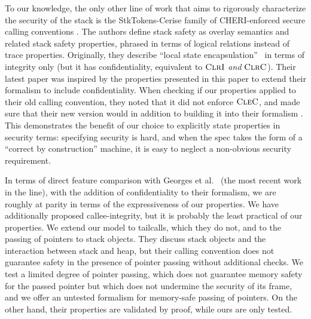 \documentclass[10pt,conference]{ieeetran}%
\theoremstyle{definition}
\begin{document}
To our knowledge, the only other line of work that aims to rigorously characterize the
security of the stack is the StkTokens-Cerise family of CHERI-enforced secure calling
conventions \cite{SkorstengaardLocal, SkorstengaardSTKJFP, Georges22:TempsDesCerises}.
%
The authors define stack safety as overlay semantics and related stack
safety properties, phrased in terms of logical relations instead of trace
properties.
%
Originally, they describe ``local state encapsulation''~\cite{SkorstengaardSTKJFP}
in terms of integrity only (but it has confidentiality, equivalent
to \(\textnormal{\sc ClrI}\) {\em and} \(\textnormal{\sc ClrC}\)). Their latest
paper \cite{Georges22:TempsDesCerises} was inspired by the properties presented
in this paper to extend their formalism to include confidentiality. When
checking if our properties applied to their old calling convention, they noted that
it did not enforce \(\textnormal{\sc CleC}\), and made sure that their new version
would in addition to building it into their formalism
\cite{Georges22:personalcommunication}. This demonstrates the benefit of our
choice to explicitly state properties in security terms: specifying security
is hard, and when the spec takes the form of a ``correct by
construction'' machine, it is easy to neglect a non-obvious security
requirement.

In terms of direct feature comparison with Georges et al.~\cite{Georges22:TempsDesCerises} (the most
recent work in the line), with the addition of confidentiality to their formalism, we
are roughly at parity in terms of the expressiveness of our properties.
We have additionally proposed callee-integrity, but it is probably the least
practical of our properties. We extend our model to tailcalls, which they do
not, and to the passing of pointers to stack objects. They discuss stack objects
and the interaction between stack and heap, but their calling convention does not
guarantee safety in the presence of pointer passing without additional checks.
We test a limited degree of pointer passing, which does not guarantee memory
safety for the passed pointer but which does not undermine the security of its
frame, and we offer an untested formalism for memory-safe passing of pointers.
On the other hand, their properties are validated by proof, while ours are
only tested.

%
\end{document}

